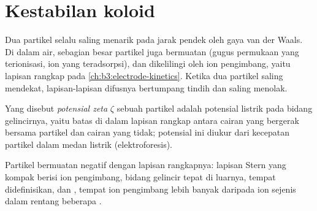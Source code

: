 \section{Kestabilan koloid}

Dua partikel  selalu saling menarik pada jarak pendek oleh gaya van der
Waals. Di dalam air, sebagian besar partikel juga bermuatan (gugus permukaan
yang terionisasi, ion yang teradsorpsi), dan dikelilingi oleh 
ion pengimbang, yaitu lapisan rangkap pada \cref{ch:b3:electrode-kinetics}. Ketika
dua partikel saling mendekat, lapisan-lapisan difusnya bertumpang tindih dan
saling menolak.

\begin{definition}\label{def:b3:colloids:zeta}
Yang disebut \emph{potensial zeta} $\zeta$ sebuah partikel adalah potensial
listrik pada bidang gelincirnya, yaitu batas di dalam lapisan rangkap antara
cairan yang bergerak bersama partikel dan cairan yang tidak; potensial ini
diukur dari kecepatan partikel dalam medan listrik (elektroforesis).
\end{definition}

\begin{omfigure}

{\small Partikel bermuatan negatif dengan lapisan rangkapnya: lapisan Stern
yang kompak berisi ion pengimbang, bidang gelincir tepat di luarnya, tempat
 didefinisikan, dan , tempat ion pengimbang lebih
banyak daripada ion sejenis dalam rentang beberapa .}
\end{omfigure}

